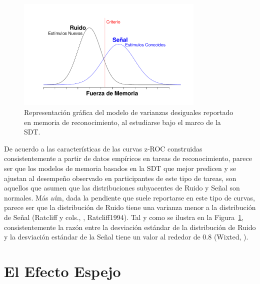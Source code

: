 \begin{figure}[h]
\centering
\includegraphics[width=0.80\textwidth]{Figures/RM_SDT_2} 
\caption[SDT en memoria de reconocimiento (varianzas desiguales)]{Representación gráfica del modelo de varianzas desiguales reportado en memoria de reconocimiento, al estudiarse bajo el marco de la SDT.}
\label{fig:RM_SDT_2}
\end{figure}


De acuerdo a las características de las curvas z-ROC construidas consistentemente a partir de datos empíricos en tareas de reconocimiento, parece ser que los modelos de memoria basados en la SDT que mejor predicen y se ajustan al desempeño observado en participantes de este tipo de tareas, son aquellos que asumen que las distribuciones subyacentes de Ruido y Señal son normales. Más aún, dada la pendiente que suele reportarse en este tipo de curvas, parece ser que la distribución de Ruido tiene una varianza menor a la distribución de Señal (Ratcliff y cols., \citeyear{ Ratcliff1992}, {Ratcliff1994}). Tal y como se ilustra en la Figura~\ref{fig:RM_SDT_2}, consistentemente la razón entre la desviación estándar de la distribución de Ruido y la desviación estándar de la Señal tiene un valor al rededor de 0.8 (Wixted, \citeyear{Wixted2007}).\\










\section{El Efecto Espejo}

